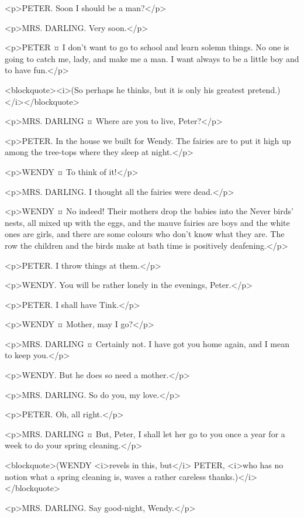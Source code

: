 <p>PETER. Soon I should be a man?</p>

<p>MRS. DARLING. Very soon.</p>

<p>PETER ¤
I don't want to go to school and learn solemn things. No one is going to catch me, lady, and make me a man. I want always to be a little boy and to have fun.</p>

<blockquote><i>(So perhaps he thinks, but it is only his greatest pretend.)</i></blockquote>

<p>MRS. DARLING ¤
Where are you to live, Peter?</p>

<p>PETER. In the house we built for Wendy. The fairies are to put it high up among the tree-tops where they sleep at night.</p>

<p>WENDY ¤
To think of it!</p>

<p>MRS. DARLING. I thought all the fairies were dead.</p>

<p>WENDY ¤
No indeed! Their mothers drop the babies into the Never birds' nests, all mixed up with the eggs, and the mauve fairies are boys and the white ones are girls, and there are some colours who don't know what they are. The row the children and the birds make at bath time is positively deafening.</p>

<p>PETER. I throw things at them.</p>

<p>WENDY. You will be rather lonely in the evenings, Peter.</p>

<p>PETER. I shall have Tink.</p>

<p>WENDY ¤
Mother, may I go?</p>

<p>MRS. DARLING ¤
Certainly not. I have got you home again, and I mean to keep you.</p>

<p>WENDY. But he does so need a mother.</p>

<p>MRS. DARLING. So do you, my love.</p>

<p>PETER. Oh, all right.</p>

<p>MRS. DARLING ¤
But, Peter, I shall let her go to you once a year for a week to do your spring cleaning.</p>

<blockquote>(WENDY <i>revels in this, but</i> PETER, <i>who has no notion what a spring cleaning is, waves a rather careless thanks.)</i></blockquote>

<p>MRS. DARLING. Say good-night, Wendy.</p>

